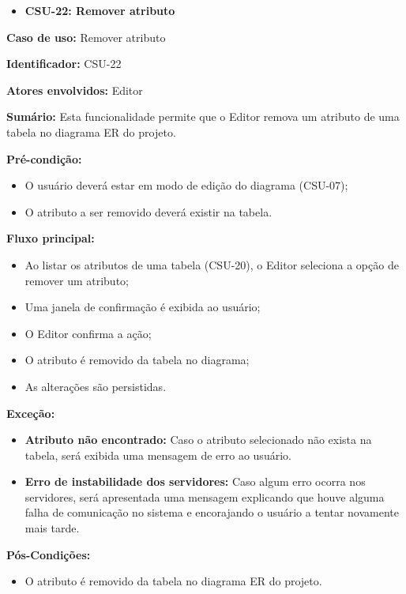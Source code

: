 \vspace{1em}

\begin{itemize}
    \item \textbf{CSU-22: Remover atributo}
\end{itemize}

\textbf{Caso de uso:} Remover atributo

\textbf{Identificador:} CSU-22

\textbf{Atores envolvidos:} Editor

\textbf{Sumário:} Esta funcionalidade permite que o Editor remova um atributo de uma tabela no diagrama ER do projeto.

\textbf{Pré-condição:}
\begin{itemize}
    \item O usuário deverá estar em modo de edição do diagrama (CSU-07);
    \item O atributo a ser removido deverá existir na tabela.
\end{itemize}

\textbf{Fluxo principal:}
\begin{itemize}
    \item Ao listar os atributos de uma tabela (CSU-20), o Editor seleciona a opção de remover um atributo;
    \item Uma janela de confirmação é exibida ao usuário;
    \item O Editor confirma a ação;
    \item O atributo é removido da tabela no diagrama;
    \item As alterações são persistidas.
\end{itemize}

\textbf{Exceção:}
\begin{itemize}
    \item \textbf{Atributo não encontrado:} Caso o atributo selecionado não exista na tabela, será exibida uma mensagem de erro ao usuário.
    \item \textbf{Erro de instabilidade dos servidores:} Caso algum erro ocorra nos servidores, será apresentada uma mensagem explicando que houve alguma falha de comunicação no sistema e encorajando o usuário a tentar novamente mais tarde.
\end{itemize}

\textbf{Pós-Condições:}
\begin{itemize}
    \item O atributo é removido da tabela no diagrama ER do projeto.
\end{itemize}

